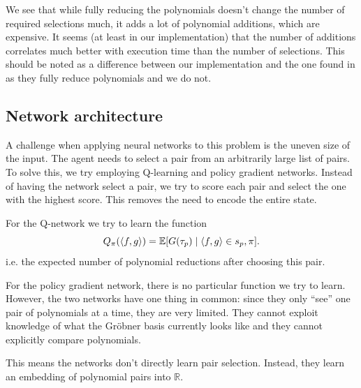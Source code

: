 \documentclass{article}
\theoremstyle{changedot}
\theoremstyle{changedotbreak}
\theoremstyle{nonumberplain}
\DeclarePairedDelimiter{\tuple}{\langle}{\rangle}
\newcommand{\m}{\mathbb}
\begin{document}
We see that while fully reducing the polynomials doesn't change the number of required selections much, it adds a lot of polynomial additions, which are expensive. It seems (at least in our implementation) that the number of additions correlates much better with execution time than the number of selections. This should be noted as a difference between our implementation and the one found in \cite{peifer} as they fully reduce polynomials and we do not.




\subsection{Network architecture}
A challenge when applying neural networks to this problem is the uneven size of the input. The agent needs to select a pair from an arbitrarily large list of pairs. To solve this, we try employing Q-learning and policy gradient networks. Instead of having the network select a pair, we try to score each pair and select the one with the highest score. This removes the need to encode the entire state.

For the Q-network we try to learn the function \[Q_{\pi}(\tuple{f, g}) = \m E[G(\tau_{p}) \mid \tuple{f, g} \in s_{p}, \pi].\] i.e. the expected number of polynomial reductions after choosing this pair.

For the policy gradient network, there is no particular function we try to learn. However, the two networks have one thing in common: since they only ``see'' one pair of polynomials at a time, they are very limited. They cannot exploit knowledge of what the Gröbner basis currently looks like and they cannot explicitly compare polynomials.

This means the networks don't directly learn pair selection. Instead, they learn an embedding of polynomial pairs into $\m R$.
\end{document}
